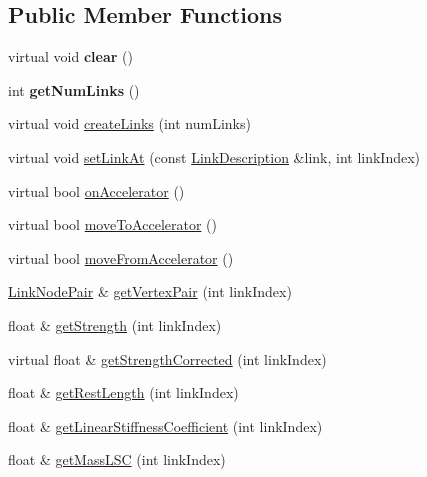 \subsection*{Public Member Functions}
\begin{DoxyCompactItemize}
\item 
\mbox{\label{classbtSoftBodyLinkData_a9a664715147e0f7858236fd2251fc298}} 
virtual void {\bfseries clear} ()
\item 
\mbox{\label{classbtSoftBodyLinkData_a5699392f6a67800771651d3ac5a26350}} 
int {\bfseries get\+Num\+Links} ()
\item 
virtual void \hyperlink{classbtSoftBodyLinkData_a1713d14604037ca88d7915d627a32a13}{create\+Links} (int num\+Links)
\item 
virtual void \hyperlink{classbtSoftBodyLinkData_a44f200dcb878405cebf3704dc7a8b8cd}{set\+Link\+At} (const \hyperlink{classbtSoftBodyLinkData_1_1LinkDescription}{Link\+Description} \&link, int link\+Index)
\item 
virtual bool \hyperlink{classbtSoftBodyLinkData_ae284c2a182ddf82dde057a8c2eb17ac3}{on\+Accelerator} ()
\item 
virtual bool \hyperlink{classbtSoftBodyLinkData_a6cce268f804d465f3bc998771d3a7433}{move\+To\+Accelerator} ()
\item 
virtual bool \hyperlink{classbtSoftBodyLinkData_a5018ad236aae590df94bca63c1ad7ee1}{move\+From\+Accelerator} ()
\item 
\hyperlink{classbtSoftBodyLinkData_1_1LinkNodePair}{Link\+Node\+Pair} \& \hyperlink{classbtSoftBodyLinkData_ab0e3a69e9aec84ed318b3a3d17f57051}{get\+Vertex\+Pair} (int link\+Index)
\item 
float \& \hyperlink{classbtSoftBodyLinkData_aedff3a1100ab4177e7035a6400f91b87}{get\+Strength} (int link\+Index)
\item 
virtual float \& \hyperlink{classbtSoftBodyLinkData_a3b6e8d1a150ec23efd999760ea7a17b3}{get\+Strength\+Corrected} (int link\+Index)
\item 
float \& \hyperlink{classbtSoftBodyLinkData_a2552fa98541e800fc6de8ef7ec2a6a8e}{get\+Rest\+Length} (int link\+Index)
\item 
float \& \hyperlink{classbtSoftBodyLinkData_a971e0e406838f2c2d3b88db80747d09d}{get\+Linear\+Stiffness\+Coefficient} (int link\+Index)
\item 
float \& \hyperlink{classbtSoftBodyLinkData_a4738763134cedd630e826f2346947935}{get\+Mass\+L\+SC} (int link\+Index)

\end{DoxyCompactItemize}
